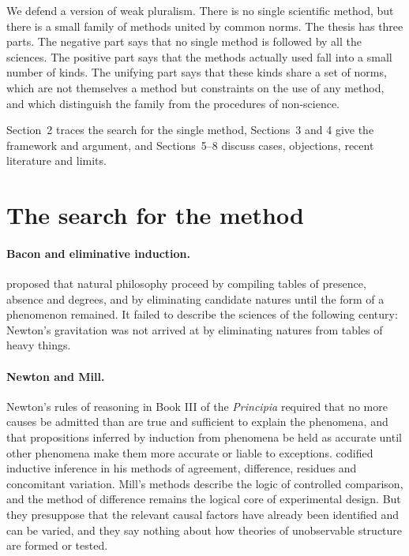 \documentclass{situationist-preprint}
\begin{document}
We defend a version of weak pluralism. There is no single scientific method, but there is a small family of methods united by common norms. The thesis has three parts. The negative part says that no single method is followed by all the sciences. The positive part says that the methods actually used fall into a small number of kinds. The unifying part says that these kinds share a set of norms, which are not themselves a method but constraints on the use of any method, and which distinguish the family from the procedures of non-science.

Section~2 traces the search for the single method, Sections~3 and 4 give the framework and argument, and Sections~5--8 discuss cases, objections, recent literature and limits.

\section{The search for the method}

\paragraph{Bacon and eliminative induction.} \citet{Bacon1620} proposed that natural philosophy proceed by compiling tables of presence, absence and degrees, and by eliminating candidate natures until the form of a phenomenon remained. It failed to describe the sciences of the following century: Newton's gravitation was not arrived at by eliminating natures from tables of heavy things.

\paragraph{Newton and Mill.} Newton's rules of reasoning in Book III of the \emph{Principia} required that no more causes be admitted than are true and sufficient to explain the phenomena, and that propositions inferred by induction from phenomena be held as accurate until other phenomena make them more accurate or liable to exceptions. \citet{Mill1843} codified inductive inference in his methods of agreement, difference, residues and concomitant variation. Mill's methods describe the logic of controlled comparison, and the method of difference remains the logical core of experimental design. But they presuppose that the relevant causal factors have already been identified and can be varied, and they say nothing about how theories of unobservable structure are formed or tested.
\end{document}

